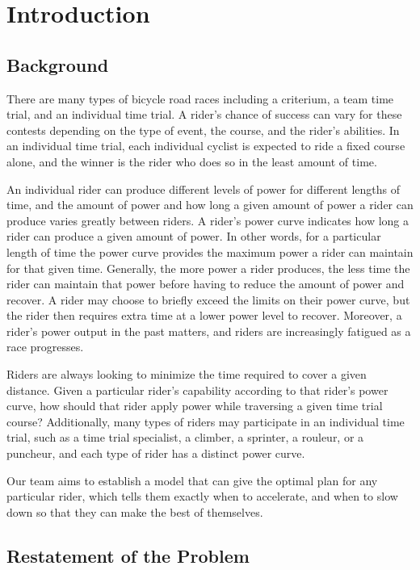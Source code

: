 \documentclass[12pt]{article}
\begin{document}
\section{Introduction}
\subsection{Background}

There are many types of bicycle road races including a criterium, a team time trial, and an
individual time trial. A rider’s chance of success can vary for these contests depending on the
type of event, the course, and the rider’s abilities. In an individual time trial, each individual
cyclist is expected to ride a fixed course alone, and the winner is the rider who does so in the
least amount of time.

An individual rider can produce different levels of power for different lengths of time, and the
amount of power and how long a given amount of power a rider can produce varies greatly
between riders. A rider’s power curve indicates how long a rider can produce a given amount of
power. In other words, for a particular length of time the power curve provides the maximum
power a rider can maintain for that given time. Generally, the more power a rider produces, the
less time the rider can maintain that power before having to reduce the amount of power and
recover. A rider may choose to briefly exceed the limits on their power curve, but the rider then
requires extra time at a lower power level to recover. Moreover, a rider’s power output in the
past matters, and riders are increasingly fatigued as a race progresses.

Riders are always looking to minimize the time required to cover a given distance. Given a
particular rider’s capability according to that rider’s power curve, how should that rider apply
power while traversing a given time trial course? Additionally, many types of riders may
participate in an individual time trial, such as a time trial specialist, a climber, a sprinter, a
rouleur, or a puncheur, and each type of rider has a distinct power curve.

Our team aims to establish a model that can give the optimal plan for any particular rider, which tells them exactly when to accelerate,
and when to slow down so that they can make the best of themselves.
\subsection{Restatement of the Problem}
\end{document}
